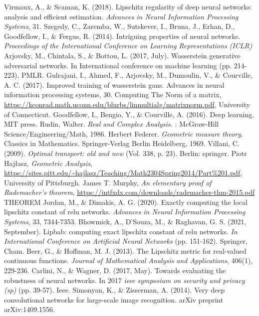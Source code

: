 \documentclass[12pt]{report}
\numberwithin{figure}{chapter}
\theoremstyle{plain}
\theoremstyle{definition}
\theoremstyle{corollary}
\theoremstyle{definition}
\theoremstyle{plain}
\theoremstyle{definition}
\theoremstyle{plain}
\begin{document}
\newpage

\begin{thebibliography}{AA}
 Virmaux, A., \& Scaman, K. (2018). Lipschitz regularity of deep neural networks: analysis and efficient estimation.
\emph{Advances in Neural Information Processing Systems}, 31.
 Szegedy, C., Zaremba, W., Sutskever, I., Bruna, J., Erhan, D., Goodfellow, I., \& Fergus, R. (2014). Intriguing properties of neural networks. \emph{Proceedings of the International Conference on Learning Representations (ICLR)}
 Arjovsky, M., Chintala, S., \& Bottou, L. (2017, July). Wasserstein generative adversarial networks. In International conference on machine learning (pp. 214-223). PMLR.
 Gulrajani, I., Ahmed, F., Arjovsky, M., Dumoulin, V., \& Courville, A. C. (2017). Improved training of wasserstein gans. Advances in neural information processing systems, 30.
 Computing The Norm of a matrix, \url{https://kconrad.math.uconn.edu/blurbs/linmultialg/matrixnorm.pdf}, University of Connecticut.
Goodfellow, I., Bengio, Y., \& Courville, A. (2016). Deep learning. MIT press.
 Rudin, Walter. \emph{Real and Complex Analysis.} : McGraw-Hill Science/Engineering/Math, 1986.
 Herbert Federer. \emph{Geometric measure theory.} Classics in Mathematics. Springer-Verlag Berlin Heidelberg, 1969.
 Villani, C. (2009). \emph{Optimal transport: old and new} (Vol. 338, p. 23). Berlin: springer.
 Piotr Hajłasz, \emph{Geometric Analysis}, \url{https://sites.pitt.edu/~hajlasz/Teaching/Math2304Spring2014/Part\%201.pdf}, University of Pittsburgh.
 James T. Murphy, \emph{An elementary proof of Rademacher's theorem}, \url{https://intfxdx.com/downloads/rademacher-thm-2015.pdf}
THEOREM
 Jordan, M., \& Dimakis, A. G. (2020). Exactly computing the local lipschitz constant of relu networks. \emph{Advances in Neural Information Processing Systems}, 33, 7344-7353.
 Bhowmick, A., D’Souza, M., \& Raghavan, G. S. (2021, September). Lipbab: computing exact lipschitz constant of relu networks. \emph{In International Conference on Artificial Neural Networks} (pp. 151-162). Springer, Cham.
 Beer, G., \& Hoffman, M. J. (2013). The Lipschitz metric for real-valued continuous functions. \emph{Journal of Mathematical Analysis and Applications}, 406(1), 229-236.
 Carlini, N., \& Wagner, D. (2017, May). Towards evaluating the robustness of neural networks. In 2017 \emph{ieee symposium on security and privacy (sp)} (pp. 39-57). Ieee.
 Simonyan, K., \& Zisserman, A. (2014). Very deep convolutional networks for large-scale image recognition. arXiv preprint arXiv:1409.1556.

\end{thebibliography}

%
%
%
%
%
\end{document}
